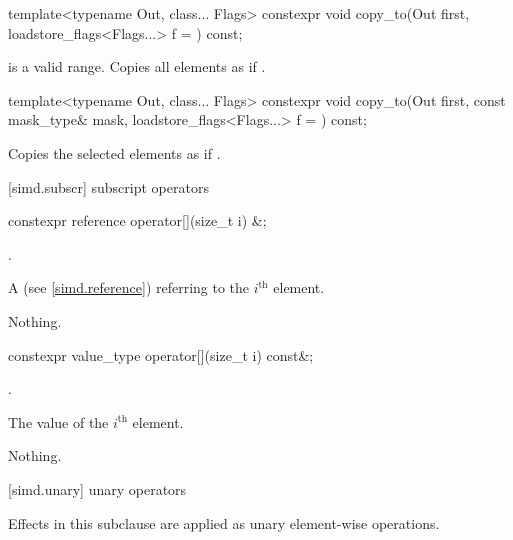 \begin{itemdecl}
template<typename Out, class... Flags>
  constexpr void copy_to(Out first, loadstore_flags<Flags...> f = {}) const;
\end{itemdecl}

\begin{itemdescr}
  \SimdStoreDescr
    {\tcode{[first, first + size())} is a valid range.}
    {Copies all  elements as if  \foralli.}
\end{itemdescr}

\begin{itemdecl}
template<typename Out, class... Flags>
  constexpr void copy_to(Out first, const mask_type& mask, loadstore_flags<Flags...> f = {}) const;
\end{itemdecl}

\begin{itemdescr}
  \SimdStoreDescr
    {\validMaskedRange}
    {Copies the selected elements as if  \forallmaskedi.}
\end{itemdescr}

[simd.subscr]{ subscript operators}

\begin{itemdecl}
constexpr reference operator[](size_t i) &;
\end{itemdecl}

\begin{itemdescr}
  \pnum\requires
  .

  \pnum\returns
  A  (see \ref{simd.reference}) referring to the $i^\text{th}$ element.

  \pnum\throws Nothing.
\end{itemdescr}

\begin{itemdecl}
constexpr value_type operator[](size_t i) const&;
\end{itemdecl}

\begin{itemdescr}
  \pnum\requires
  .

  \pnum\returns
  The value of the $i^\text{th}$ element.

  \pnum\throws Nothing.
\end{itemdescr}

[simd.unary]{ unary operators}

\pnum
Effects in this subclause are applied as unary element-wise operations.

